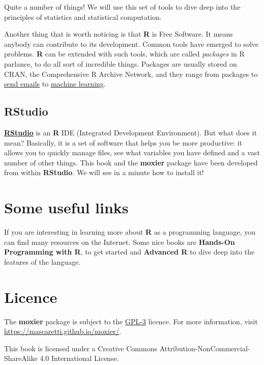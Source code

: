 \documentclass[]{book}
\begin{document}
Quite a number of things! We will use this set of tools to dive deep
into the principles of statistics and statistical computation.

Another thing that is worth noticing is that \textbf{R} is Free
Software. It means anybody can contribute to its development. Common
tools have emerged to solve problems. \textbf{R} can be extended with
such tools, which are called \emph{packages} in R parlance, to do all
sort of incredible things. Packages are usually stored on CRAN, the
Comprehensive R Archive Network, and they range from packages to
\href{https://rich-iannone.github.io/blastula/}{send emails} to
\href{https://cran.r-project.org/web/views/MachineLearning.html}{machine
learning}.

\subsection{RStudio}\label{rstudio}

\href{https://rstudio.com/}{\textbf{RStudio}} is an \textbf{R} IDE
(Integrated Development Environment). But what does it mean? Basically,
it is a set of software that helps you be more productive: it allows you
to quickly manage files, see what variables you have defined and a vast
number of other things. This book and the \textbf{moxier} package have
been developed from within \textbf{RStudio}. We will see in a minute how
to install it!

\section{Some useful links}\label{some-useful-links}

If you are interesting in learning more about \textbf{R} as a
programming language, you can find many resources on the Internet. Some
nice books are \textbf{Hands-On Programming with R},
\citep{grolemund2014} to get started and \textbf{Advanced R}
\citep{wickham2019} to dive deep into the features of the language.

\section{Licence}\label{licence}

The \textbf{moxier} package is subject to the
\href{https://www.r-project.org/Licenses/GPL-3}{GPL-3} licence. For more
information, visit \url{https://mascaretti.github.io/moxier/}.

This book is licensed under a Creative Commons
Attribution-NonCommercial-ShareAlike 4.0 International License.
\end{document}
